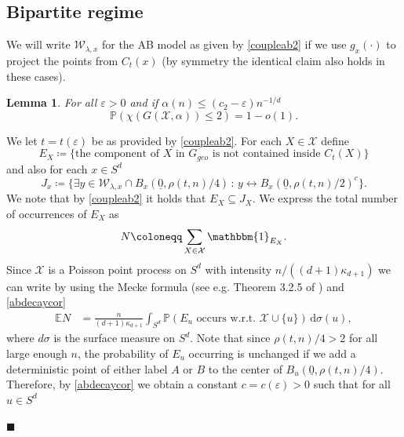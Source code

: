 \documentclass[11pt]{article}%
\newenvironment{proof}{\vspace{1ex}\noindent{\bf Proof.}}{\hspace*{\fill}$\blacksquare$\vspace{1ex}}
\newtheorem{lemma}[lemma]{Lemma}
\newcommand{\eps}{\varepsilon}
\newcommand{\Pro}{\mathbb{P}}
\newcommand{\Ex}{\mathbb{E}}
\newcommand{\typ}{\underline{0}}
\begin{document}
\subsection{Bipartite regime}


We will write $ \mathcal{W}_{\lambda,x} $ for the AB model as given by \cref{coupleab2} if we 
use  $g_x(\cdot)$ to project the points from $ C_t(x) $ (by symmetry the identical claim also holds in these cases).

\begin{lemma}\label{chrom2}
	For all $ \eps>0 $ and if $  \alpha(n)\leq (c_2-\eps)n^{-1/d} $ 
	\begin{equation*}
		\Pro(\chi(G(\mathcal{X},\alpha))\leq  2)= 1-o(1).
	\end{equation*}
\end{lemma}
\begin{proof}
    We let $t=t(\eps)$ be as provided by \cref{coupleab2}. For each $X\in \mathcal{X}$ define
    \begin{equation*}
        E_{X}\coloneqq\{ \text{the component of }X \text{ in } G_{geo} \text{ is not contained inside } C_t(X)\} 
    \end{equation*}
    and also for each $x\in S^d$ 
    \begin{equation*}
        J_x\coloneqq\{\exists y\in \mathcal{W}_{\lambda,x}\cap B_x(\typ,\rho(t,n)/4)\,:\, y\longleftrightarrow  B_x(\typ,\rho(t,n)/2)^c\}.
    \end{equation*}
    We note that by \cref{coupleab2} it holds that $E_{X}\subseteq J_{{X}}$.
    We express the total number of occurrences of $E_{X}$ as 
    \begin{equation*}
        N\coloneqq\sum_{X\in \mathcal{X}} \mathbbm{1}_{E_{X}}.
    \end{equation*}
    Since $\mathcal{X}$ is a Poisson point process on $S^d$ with intensity $n/((d+1)\kappa_{d+1})$ we can write by using the Mecke formula (see e.g. Theorem 3.2.5 of \cite{schneider2008stochastic}) and \cref{abdecaycor}
    \begin{equation*}
    \begin{split}
        \Ex N &=\frac{n}{(d+1)\kappa_{d+1}}  \int_{S^d}\Pro(E_u\text{ occurs w.r.t. }\mathcal{X}\cup\{u\} )\,\text{d}\sigma(u),
    \end{split}
    \end{equation*}
    where $d\sigma$ is the surface measure on $S^d$. Note that since $\rho(t,n)/4>2$ for all large enough $n$, the probability of $E_u$ occurring is unchanged if we add a deterministic point of either label $A$ or $B$ to the center of $B_u(\typ,\rho(t,n)/4)$. Therefore, by \cref{abdecaycor} we obtain a constant $c=c(\eps)>0$ such that for all $u\in S^d$

\end{proof}
\end{document}
